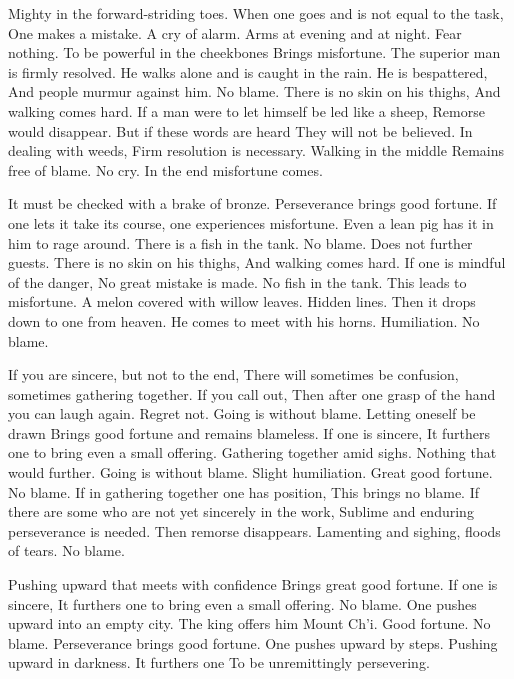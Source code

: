 {Mighty in the forward-striding toes.
 When one goes and is not equal to the task,
 One makes a mistake.}
{A cry of alarm. Arms at evening and at night.
 Fear nothing.}
{To be powerful in the cheekbones
 Brings misfortune.
 The superior man is firmly resolved.
 He walks alone and is caught in the rain.
 He is bespattered,
 And people murmur against him.
 No blame.}
{There is no skin on his thighs,
 And walking comes hard.
 If a man were to let himself be led like a sheep,
 Remorse would disappear.
 But if these words are heard
 They will not be believed.}
{In dealing with weeds,
 Firm resolution is necessary.
 Walking in the middle
 Remains free of blame.}
{No cry.
 In the end misfortune comes.}

{It must be checked with a brake of bronze.
 Perseverance brings good fortune.
 If one lets it take its course, one experiences misfortune.
 Even a lean pig has it in him to rage around.}
{There is a fish in the tank. No blame.
 Does not further guests.}
{There is no skin on his thighs,
 And walking comes hard.
 If one is mindful of the danger,
 No great mistake is made.}
{No fish in the tank.
 This leads to misfortune.}
{A melon covered with willow leaves.
 Hidden lines.
 Then it drops down to one from heaven.}
{He comes to meet with his horns.
 Humiliation. No blame.}

{If you are sincere, but not to the end,
 There will sometimes be confusion, sometimes gathering together.
 If you call out,
 Then after one grasp of the hand you can laugh again.
 Regret not. Going is without blame.}
{Letting oneself be drawn
 Brings good fortune and remains blameless.
 If one is sincere,
 It furthers one to bring even a small offering.}
{Gathering together amid sighs.
 Nothing that would further.
 Going is without blame.
 Slight humiliation.}
{Great good fortune. No blame.}
{If in gathering together one has position,
 This brings no blame.
 If there are some who are not yet sincerely in the work,
 Sublime and enduring perseverance is needed.
 Then remorse disappears.}
{Lamenting and sighing, floods of tears.
 No blame.}

{Pushing upward that meets with confidence
 Brings great good fortune.}
{If one is sincere,
 It furthers one to bring even a small offering.
 No blame.}
{One pushes upward into an empty city.}
{The king offers him Mount Ch’i.
 Good fortune. No blame.}
{Perseverance brings good fortune.
 One pushes upward by steps.}
{Pushing upward in darkness.
 It furthers one
 To be unremittingly persevering.}

